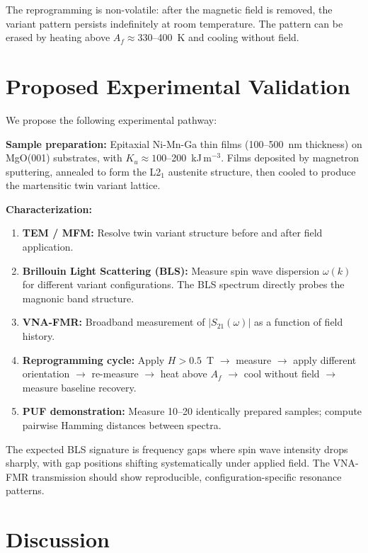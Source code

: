 \documentclass[aip,jap,reprint,floatfix,nofootinbib]{revtex4-2}
\begin{document}
The reprogramming is non-volatile: after the magnetic field is removed, the variant pattern persists indefinitely at room temperature. The pattern can be erased by heating above $A_f \approx 330$--400~K and cooling without field.

\section{Proposed Experimental Validation}
\label{sec:experiment}

We propose the following experimental pathway:

\textbf{Sample preparation:} Epitaxial Ni-Mn-Ga thin films (100--500~nm thickness) on MgO(001) substrates, with $K_u \approx 100$--200~kJ\,m$^{-3}$. Films deposited by magnetron sputtering, annealed to form the L2$_1$ austenite structure, then cooled to produce the martensitic twin variant lattice.

\textbf{Characterization:}
\begin{enumerate}
    \item \textbf{TEM / MFM:} Resolve twin variant structure before and after field application.
    \item \textbf{Brillouin Light Scattering (BLS):} Measure spin wave dispersion $\omega(k)$ for different variant configurations. The BLS spectrum directly probes the magnonic band structure.
    \item \textbf{VNA-FMR:} Broadband measurement of $|S_{21}(\omega)|$ as a function of field history.
    \item \textbf{Reprogramming cycle:} Apply $H > 0.5$~T $\to$ measure $\to$ apply different orientation $\to$ re-measure $\to$ heat above $A_f$ $\to$ cool without field $\to$ measure baseline recovery.
    \item \textbf{PUF demonstration:} Measure 10--20 identically prepared samples; compute pairwise Hamming distances between spectra.
\end{enumerate}

The expected BLS signature is frequency gaps where spin wave intensity drops sharply, with gap positions shifting systematically under applied field. The VNA-FMR transmission should show reproducible, configuration-specific resonance patterns.

\section{Discussion}
\label{sec:discussion}
\end{document}
